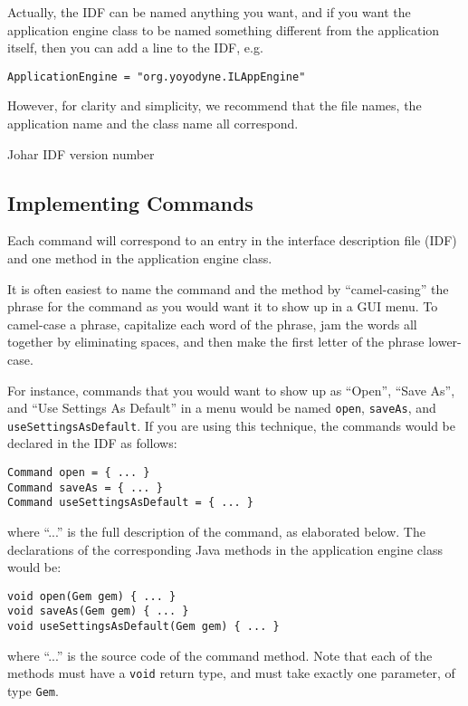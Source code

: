 \documentclass[11pt]{report}
\begin{document}
Actually, the IDF can be named anything
you want, and if you want the application engine class to be
named something different from the application itself, then
you can add a line to the IDF, e.g.
\begin{verbatim}
ApplicationEngine = "org.yoyodyne.ILAppEngine"
\end{verbatim}
However, for clarity and simplicity, we recommend that the file
names, the application name and the class name all correspond.

Johar IDF version number

\subsection{Implementing Commands}

Each command will correspond to an entry in the interface
description file (IDF) and one method in the application
engine class.

It is often easiest to name the command and the method by
``camel-casing'' the phrase for the command as you would want it
to show up in a GUI menu.  To camel-case a phrase, capitalize
each word of the phrase, jam the words all together by
eliminating spaces, and then make the first letter of the phrase
lower-case.

For instance, commands that you would want to show up as
``Open'', ``Save As'', and ``Use Settings As Default'' in a
menu would be named {\tt open}, {\tt saveAs}, and {\tt useSettingsAsDefault}.
If you are using this technique, the commands would be declared
in the IDF as follows:
\begin{verbatim}
Command open = { ... }
Command saveAs = { ... }
Command useSettingsAsDefault = { ... }
\end{verbatim}
where ``...'' is the full description of the command, as
elaborated below.  The declarations of the corresponding Java
methods in the application engine class would be:
\begin{verbatim}
void open(Gem gem) { ... }
void saveAs(Gem gem) { ... }
void useSettingsAsDefault(Gem gem) { ... }
\end{verbatim}
where ``...'' is the source code of the command method.
Note that each of the methods must have a {\tt void} return type,
and must take exactly one parameter, of type {\tt Gem}.
\end{document}
